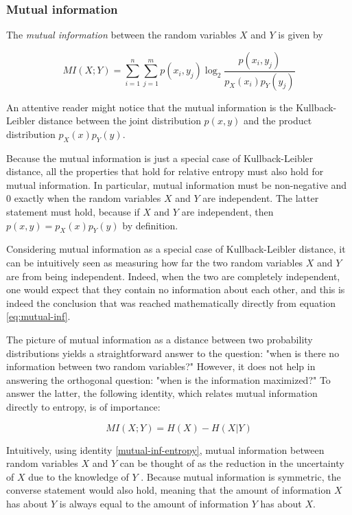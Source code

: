 \documentclass[12pt]{article}
\begin{document}
\subsubsection{Mutual information}

The \textit{mutual information} \cite{cover-thomas} between the random variables $X$ and $Y$ is given by 

\begin{equation}
MI(X;Y) = \sum_{i=1}^n \sum_{j=1}^m p(x_i,y_j) \log_2 \frac{p(x_i,y_j)}{p_X(x_i)p_Y(y_j)}
\label{eq:mutual-inf}
\end{equation}

An attentive reader might notice that the mutual information is the Kullback-Leibler distance between the joint distribution $p(x,y)$ and the product distribution $p_X(x)p_Y(y)$.

Because the mutual information is just a special case of Kullback-Leibler distance, all the properties that hold for relative entropy must also hold for mutual information. In particular, mutual information must be non-negative and 0 exactly when the random variables $X$ and $Y$ are independent. The latter statement must hold, because if $X$ and $Y$ are independent, then $p(x,y) = p_X(x)p_Y(y)$ by definition. 

Considering mutual information as a special case of Kullback-Leibler distance, it can be intuitively seen as measuring how far the two random variables $X$ and $Y$ are from being independent. Indeed, when the two are completely independent, one would expect that they contain no information about each other, and this is indeed the conclusion that was reached mathematically directly from equation \ref{eq:mutual-inf}.

The picture of mutual information as a distance between two probability distributions yields a straightforward answer to the question: "when is there no information between two random variables?" However, it does not help in answering the orthogonal question: "when is the information maximized?" To answer the latter, the following identity, which relates mutual information directly to entropy, is of importance: 

\begin{equation}
MI(X;Y) = H(X) - H(X|Y)
\label{mutual-inf-entropy}  
\end{equation}

Intuitively, using identity \ref{mutual-inf-entropy}, mutual information between random variables $X$ and $Y$ can be thought of as the reduction in the uncertainty of $X$ due to the knowledge of $Y$ \cite{cover-thomas}. Because mutual information is symmetric, the converse statement would also hold, meaning that the amount of information $X$ has about $Y$ is always equal to the amount of information $Y$ has about $X$. 
\end{document}
